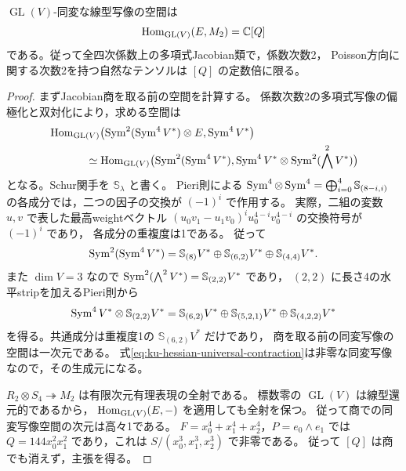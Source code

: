 \begin{proposition}
\label{prop:ku-degree-two-polynomial-rigidity}
$\operatorname{GL}(V)$-同変な線型写像の空間は
\[
 \operatorname{Hom}_{\operatorname{GL}(V)}(E,M_2)=\mathbb C[Q]
\]
である。従って全四次係数上の多項式Jacobian類で，係数次数2，
Poisson方向に関する次数2を持つ自然なテンソルは $[Q]$ の定数倍に限る。
\end{proposition}
\begin{proof}
まずJacobian商を取る前の空間を計算する。
係数次数2の多項式写像の偏極化と双対化により，求める空間は
\begin{align*}
 &\Hom_{\operatorname{GL}(V)}
       \bigl(\Sym^2(\Sym^4V^*)\otimes E,\Sym^4V^*\bigr)\\
 &\hspace{12mm}\simeq
   \Hom_{\operatorname{GL}(V)}
       \bigl(\Sym^2(\Sym^4V^*),
             \Sym^4V^*\otimes\Sym^2(\bigwedge^2V^*)\bigr)
\end{align*}
となる。Schur関手を $\mathbb S_\lambda$ と書く。
Pieri則\cite[Proposition~3.2.1]{GurevichHowe2021}による
$\operatorname{Sym}^4\otimes\operatorname{Sym}^4=\bigoplus_{i=0}^4\mathbb S_{(8-i,i)}$
の各成分では，二つの因子の交換が $(-1)^i$ で作用する。
実際，二組の変数 $u,v$ で表した最高weightベクトル
$(u_0v_1-u_1v_0)^iu_0^{4-i}v_0^{4-i}$ の交換符号が $(-1)^i$ であり，
各成分の重複度は1である。
従って
\[
 \operatorname{Sym}^2(\operatorname{Sym}^4V^*)
 =\mathbb S_{(8)}V^*\oplus\mathbb S_{(6,2)}V^*
   \oplus\mathbb S_{(4,4)}V^*.
\]
また $\dim V=3$ なので
$\operatorname{Sym}^2(\bigwedge^2V^*)=\mathbb S_{(2,2)}V^*$ であり，
$(2,2)$ に長さ4の水平stripを加えるPieri則から
\[
 \operatorname{Sym}^4V^*\otimes\mathbb S_{(2,2)}V^*
 =\mathbb S_{(6,2)}V^*\oplus\mathbb S_{(5,2,1)}V^*
   \oplus\mathbb S_{(4,2,2)}V^*
\]
を得る。共通成分は重複度1の $\mathbb S_{(6,2)}V^*$ だけであり，
商を取る前の同変写像の空間は一次元である。
式\eqref{eq:ku-hessian-universal-contraction}は非零な同変写像なので，その生成元になる。

$R_2\otimes S_4\twoheadrightarrow M_2$ は有限次元有理表現の全射である。
標数零の $\operatorname{GL}(V)$ は線型還元的であるから，
$\operatorname{Hom}_{\operatorname{GL}(V)}(E,-)$ を適用しても全射を保つ。
従って商での同変写像空間の次元は高々1である。
$F=x_0^4+x_1^4+x_2^4$，$P=e_0\wedge e_1$ では
$Q=144x_0^2x_1^2$ であり，これは
$S/(x_0^3,x_1^3,x_2^3)$ で非零である。
従って $[Q]$ は商でも消えず，主張を得る。
\end{proof}

